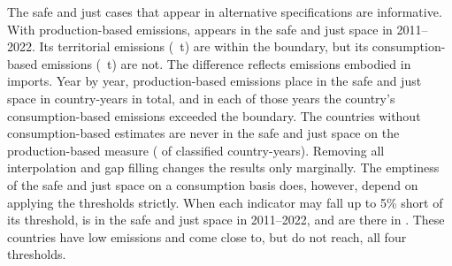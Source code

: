 The safe and just cases that appear in alternative specifications are informative. With production-based emissions, \nProdSafeList{} appears in the safe and just space in 2011--2022. Its territorial emissions (\nProdSafeProd~t) are within the boundary, but its consumption-based emissions (\nProdSafeCons~t) are not. The difference reflects emissions embodied in imports. Year by year, production-based emissions place \nProdSafeCountriesAll{} in the safe and just space in \nProdSafeYearsAll{} country-years in total, and in each of those years the country's consumption-based emissions exceeded the boundary. The \nMissOutN{} countries without consumption-based estimates are never in the safe and just space on the production-based measure (\nNoConsSafeYears{} of \nNoConsClassifiedYears{} classified country-years). Removing all interpolation and gap filling changes the results only marginally. The emptiness of the safe and just space on a consumption basis does, however, depend on applying the thresholds strictly. When each indicator may fall up to 5\% short of its threshold, \nRobTolSafePeriod{} is in the safe and just space in 2011--2022, and \nRobTolSafeYear{} are there in \nLastYear. These countries have low emissions and come close to, but do not reach, all four thresholds.
